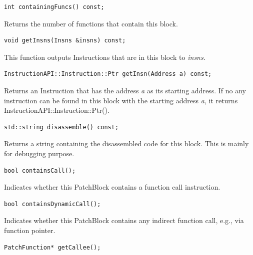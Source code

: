 \documentclass[11pt]{article}
\begin{document}
\begin{verbatim}
int containingFuncs() const;

\end{verbatim}



Returns the number of functions that contain this block.


\begin{verbatim}
void getInsns(Insns &insns) const;

\end{verbatim}



This function outputs Instructions that are in this block to \emph{insns}.


\begin{verbatim}
InstructionAPI::Instruction::Ptr getInsn(Address a) const;

\end{verbatim}



Returns an Instruction that has the address \emph{a} as its starting address. If no
any instruction can be found in this block with the starting address \emph{a}, it
returns InstructionAPI::Instruction::Ptr().


\begin{verbatim}
std::string disassemble() const;

\end{verbatim}



Returns a string containing the disassembled code for this block. This is mainly
for debugging purpose.


\begin{verbatim}
bool containsCall();

\end{verbatim}



Indicates whether this PatchBlock contains a function call instruction.


\begin{verbatim}
bool containsDynamicCall();

\end{verbatim}



Indicates whether this PatchBlock contains any indirect function call, e.g., via
function pointer.


\begin{verbatim}
PatchFunction* getCallee();

\end{verbatim}
\end{document}

